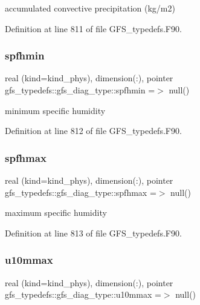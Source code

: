 accumulated convective precipitation (kg/m2) 



Definition at line 811 of file G\+F\+S\+\_\+typedefs.\+F90.

\mbox{\label{structgfs__typedefs_1_1gfs__diag__type_af6e9e0ae61d0394b0242429712d36a92}} 
\subsubsection{spfhmin}
{\footnotesize\ttfamily real (kind=kind\+\_\+phys), dimension(\+:), pointer gfs\+\_\+typedefs\+::gfs\+\_\+diag\+\_\+type\+::spfhmin =$>$ null()}



minimum specific humidity 



Definition at line 812 of file G\+F\+S\+\_\+typedefs.\+F90.

\mbox{\label{structgfs__typedefs_1_1gfs__diag__type_a4aee658d400f1492d749aefebee20856}} 
\subsubsection{spfhmax}
{\footnotesize\ttfamily real (kind=kind\+\_\+phys), dimension(\+:), pointer gfs\+\_\+typedefs\+::gfs\+\_\+diag\+\_\+type\+::spfhmax =$>$ null()}



maximum specific humidity 



Definition at line 813 of file G\+F\+S\+\_\+typedefs.\+F90.

\mbox{\label{structgfs__typedefs_1_1gfs__diag__type_ac9a30db8192366e2bb1ece3f5aafe8ef}} 
\subsubsection{u10mmax}
{\footnotesize\ttfamily real (kind=kind\+\_\+phys), dimension(\+:), pointer gfs\+\_\+typedefs\+::gfs\+\_\+diag\+\_\+type\+::u10mmax =$>$ null()}



